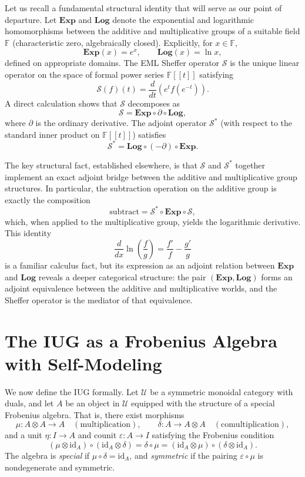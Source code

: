 \documentclass{article}
\begin{document}
Let us recall a fundamental structural identity that will serve as our point of departure. Let $\mathbf{Exp}$ and $\mathbf{Log}$ denote the exponential and logarithmic homomorphisms between the additive and multiplicative groups of a suitable field $\mathbb{F}$ (characteristic zero, algebraically closed). Explicitly, for $x \in \mathbb{F}$,
\[
\mathbf{Exp}(x) = e^x, \qquad \mathbf{Log}(x) = \ln x,
\]
defined on appropriate domains. The EML Sheffer operator $\mathcal{S}$ is the unique linear operator on the space of formal power series $\mathbb{F}[[t]]$ satisfying
\[
\mathcal{S}(f)(t) = \frac{d}{dt} \left( e^{t} f(e^{-t}) \right).
\]
A direct calculation shows that $\mathcal{S}$ decomposes as
\[
\mathcal{S} = \mathbf{Exp} \circ \partial \circ \mathbf{Log},
\]
where $\partial$ is the ordinary derivative. The adjoint operator $\mathcal{S}^*$ (with respect to the standard inner product on $\mathbb{F}[[t]]$) satisfies
\[
\mathcal{S}^* = \mathbf{Log} \circ (-\partial) \circ \mathbf{Exp}.
\]

The key structural fact, established elsewhere, is that $\mathcal{S}$ and $\mathcal{S}^*$ together implement an exact adjoint bridge between the additive and multiplicative group structures. In particular, the subtraction operation on the additive group is exactly the composition
\[
\text{subtract} = \mathcal{S}^* \circ \mathbf{Exp} \circ \mathcal{S},
\]
which, when applied to the multiplicative group, yields the logarithmic derivative. This identity
\[
\frac{d}{dx} \ln\left(\frac{f}{g}\right) = \frac{f'}{f} - \frac{g'}{g}
\]
is a familiar calculus fact, but its expression as an adjoint relation between $\mathbf{Exp}$ and $\mathbf{Log}$ reveals a deeper categorical structure: the pair $(\mathbf{Exp}, \mathbf{Log})$ forms an adjoint equivalence between the additive and multiplicative worlds, and the Sheffer operator is the mediator of that equivalence.

\section{The IUG as a Frobenius Algebra with Self-Modeling}

We now define the IUG formally. Let $\mathcal{U}$ be a symmetric monoidal category with duals, and let $A$ be an object in $\mathcal{U}$ equipped with the structure of a special Frobenius algebra. That is, there exist morphisms
\[
\mu: A \otimes A \to A \quad (\text{multiplication}), \qquad
\delta: A \to A \otimes A \quad (\text{comultiplication}),
\]
and a unit $\eta: I \to A$ and counit $\varepsilon: A \to I$ satisfying the Frobenius condition
\[
(\mu \otimes \text{id}_A) \circ (\text{id}_A \otimes \delta) = \delta \circ \mu = (\text{id}_A \otimes \mu) \circ (\delta \otimes \text{id}_A).
\]
The algebra is \emph{special} if $\mu \circ \delta = \text{id}_A$, and \emph{symmetric} if the pairing $\varepsilon \circ \mu$ is nondegenerate and symmetric.
\end{document}
